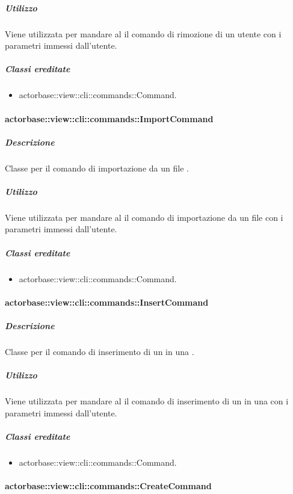 \documentclass{scalatekids-article}
\begin{document}
\subparagraph{Utilizzo}

Viene utilizzata per mandare al  il comando di rimozione di un utente con i parametri immessi dall'utente.

\subparagraph{Classi ereditate}

\begin{itemize}
\item actorbase::view::cli::commands::Command.
\end{itemize}

\paragraph{actorbase::view::cli::commands::ImportCommand}

\subparagraph{Descrizione}

Classe per il comando di importazione da un file .

\subparagraph{Utilizzo}

Viene utilizzata per mandare al  il comando di importazione da un file  con i parametri immessi dall'utente.

\subparagraph{Classi ereditate}

\begin{itemize}
\item actorbase::view::cli::commands::Command.
\end{itemize}

\paragraph{actorbase::view::cli::commands::InsertCommand}

\subparagraph{Descrizione}

Classe per il comando di inserimento di un  in una .

\subparagraph{Utilizzo}

Viene utilizzata per mandare al  il comando di inserimento di un  in una  con i parametri immessi dall'utente.

\subparagraph{Classi ereditate}

\begin{itemize}
\item actorbase::view::cli::commands::Command.
\end{itemize}

\paragraph{actorbase::view::cli::commands::CreateCommand}
\end{document}
